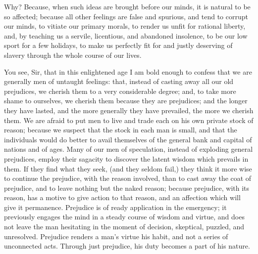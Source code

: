  Why? Because, when such ideas are brought before our minds, it is natural to be so affected; because all other feelings are false and spurious, and tend to corrupt our minds, to vitiate our primary morals, to render us unfit for rational liberty, and, by teaching us a servile, licentious, and abandoned insolence, to be our low sport for a few holidays, to make us perfectly fit for and justly deserving of slavery through the whole course of our lives.

You see, Sir, that in this enlightened age I am bold enough to confess that we are generally men of untaught feelings: that, instead of casting away all our old prejudices, we cherish them to a very considerable degree; and, to take more shame to ourselves, we cherish them because they are prejudices; and the longer they have lasted, and the more generally they have prevailed, the more we cherish them. We are afraid to put men to live and trade each on his own private stock of reason; because we suspect that the stock in each man is small, and that the individuals would do better to avail themselves of the general bank and capital of nations and of ages. Many of our men of speculation, instead of exploding general prejudices, employ their sagacity to discover the latent wisdom which prevails in them. If they find what they seek, (and they seldom fail,) they think it more wise to continue the prejudice, with the reason involved, than to cast away the coat of prejudice, and to leave nothing but the naked reason; because prejudice, with its reason, has a motive to give action to that reason, and an affection which will give it permanence. Prejudice is of ready application in the emergency; it previously engages the mind in a steady course of wisdom and virtue, and does not leave the man hesitating in the moment of decision, skeptical, puzzled, and unresolved. Prejudice renders a man's virtue his habit, and not a series of unconnected acts. Through just prejudice, his duty becomes a part of his nature.

